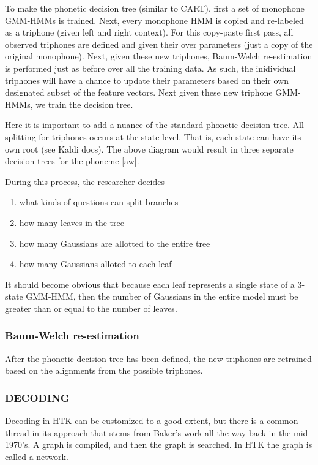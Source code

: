 \documentclass[10pt,a4paper]{article}
\begin{document}
To make the phonetic decision tree (similar to CART), first a set of monophone GMM-HMMs is trained. Next, every monophone HMM is copied and re-labeled as a triphone (given left and right context). For this copy-paste first pass, all observed triphones are defined and given their over parameters (just a copy of the original monophone). Next, given these new triphones, Baum-Welch re-estimation is performed just as before over all the training data. As such, the inidividual triphones will have a chance to update their parameters based on their own designated subset of the feature vectors. Next given these new triphone GMM-HMMs, we train the decision tree.

Here it is important to add a nuance of the standard phonetic decision tree. All splitting for triphones occurs at the state level. That is, each state can have its own root (see Kaldi docs). The above diagram would result in three separate decision trees for the phoneme [aw]. 
    
During this process, the researcher decides

\begin{enumerate}
\item what kinds of questions can split branches
\item how many leaves in the tree
\item how many Gaussians are allotted to the entire tree
\item how many Gaussians alloted to each leaf
\end{enumerate}


It should become obvious that because each leaf represents a single state of a 3-state GMM-HMM, then the number of Gaussians in the entire model must be greater than or equal to the number of leaves.

    
\subsubsection*{Baum-Welch re-estimation}

After the phonetic decision tree has been defined, the new triphones are retrained based on the alignments from the possible triphones.
    

  
\subsubsection*{DECODING}

Decoding in HTK can be customized to a good extent, but there is a common thread in its approach that stems from Baker's work all the way back in the mid-1970's. A graph is compiled, and then the graph is searched. In HTK the graph is called a network.
\end{document}
